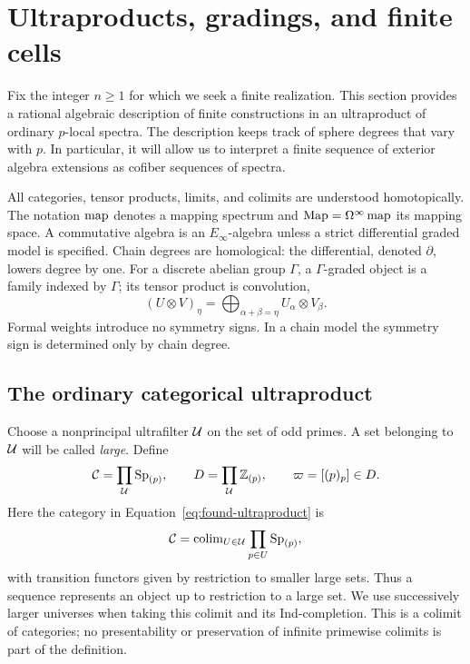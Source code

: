 \section{Ultraproducts, gradings, and finite cells}
\label{sec:foundations}

Fix the integer $n\geq 1$ for which we seek a finite realization.
This section provides a rational algebraic description of finite
constructions in an ultraproduct of ordinary $p$-local spectra.  The
description keeps track of sphere degrees that vary with $p$.  In
particular, it will allow us to interpret a finite sequence of exterior
algebra extensions as cofiber sequences of spectra.

All categories, tensor products, limits, and colimits are understood
homotopically.  The notation $\operatorname{map}$ denotes a mapping spectrum and
$\operatorname{Map}=\Omega^\infty\operatorname{map}$ its mapping space.  A commutative algebra is
an $E_\infty$-algebra unless a strict differential graded model is
specified.  Chain degrees are homological: the differential, denoted
$\partial$, lowers degree by one.  For a discrete abelian group
$\Gamma$, a $\Gamma$-graded object is a family indexed by $\Gamma$;
its tensor product is convolution,
\[
 (U\otimes V)_\eta
   =\bigoplus_{\alpha+\beta=\eta}U_\alpha\otimes V_\beta.
\]
Formal weights introduce no symmetry signs.  In a chain model the
symmetry sign is determined only by chain degree.

\subsection{The ordinary categorical ultraproduct}

Choose a nonprincipal ultrafilter $\mathcal U$ on the set of odd primes.
A set belonging to $\mathcal U$ will be called \emph{large}.  Define
\begin{equation}\label{eq:found-ultraproduct}
 \mathcal C=\prod_{\mathcal U}\mathrm{Sp}_{(p)},\qquad
 D=\prod_{\mathcal U}\mathbb Z_{(p)},\qquad
 \varpi=[(p)_p]\in D.
\end{equation}
Here the category in Equation~\eqref{eq:found-ultraproduct} is
\[
 \mathcal C=\operatorname{colim}_{U\in\mathcal U}\prod_{p\in U}\mathrm{Sp}_{(p)},
\]
with transition functors given by restriction to smaller large sets.
Thus a sequence represents an object up to restriction to a large set.
We use successively larger universes when taking this colimit and its
Ind-completion.  This is a colimit of categories; no presentability or
preservation of infinite primewise colimits is part of the definition.

